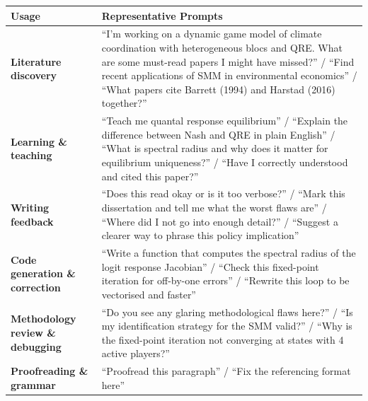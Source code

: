\documentclass[10pt,a4paper]{article}
\begin{document}
\begin{table}[h]
\small
\renewcommand{\arraystretch}{1.35}
\begin{tabular}{>{\bfseries}p{3.6cm} p{12.2cm}}
\toprule
Usage & Representative Prompts \\
\midrule

Literature discovery
  & ``I'm working on a dynamic game model of climate coordination with heterogeneous blocs and QRE.
    What are some must-read papers I might have missed?'' /
    ``Find recent applications of SMM in environmental economics'' /
    ``What papers cite Barrett (1994) and Harstad (2016) together?'' \\[4pt]

Learning \& teaching
  & ``Teach me quantal response equilibrium'' /
    ``Explain the difference between Nash and QRE in plain English'' /
    ``What is spectral radius and why does it matter for equilibrium uniqueness?'' /
    ``Have I correctly understood and cited this paper?'' \\[4pt]

Writing feedback
  & ``Does this read okay or is it too verbose?'' /
    ``Mark this dissertation and tell me what the worst flaws are'' /
    ``Where did I not go into enough detail?'' /
    ``Suggest a clearer way to phrase this policy implication'' \\[4pt]

Code generation \& correction
  & ``Write a function that computes the spectral radius of the logit response Jacobian'' /
    ``Check this fixed-point iteration for off-by-one errors'' /
    ``Rewrite this loop to be vectorised and faster'' \\[4pt]

Methodology review \& debugging
  & ``Do you see any glaring methodological flaws here?'' /
    ``Is my identification strategy for the SMM valid?'' /
    ``Why is the fixed-point iteration not converging at states with 4 active players?'' \\[4pt]

Proofreading \& grammar
  & ``Proofread this paragraph'' /
    ``Fix the referencing format here'' \\

\bottomrule
\end{tabular}
\end{table}
\end{document}
